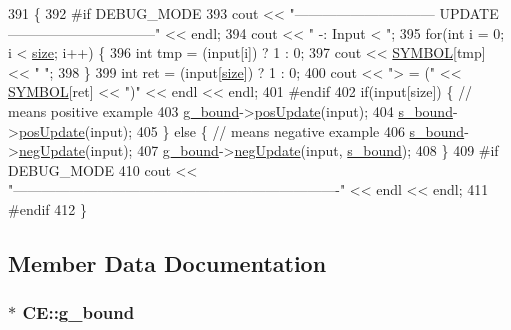\begin{DoxyCode}
391                              \{
392 \textcolor{preprocessor}{#if DEBUG\_MODE}
393 \textcolor{preprocessor}{}  cout << \textcolor{stringliteral}{"------------------------------ UPDATE --------------------------------"} << endl;
394   cout << \textcolor{stringliteral}{" -: Input < "};
395   \textcolor{keywordflow}{for}(\textcolor{keywordtype}{int} i = 0; i < \hyperlink{class_c_e_a379f23d0ec5cc0448ad7c1428403e005}{size}; i++) \{
396     \textcolor{keywordtype}{int} tmp = (input[i]) ? 1 : 0;
397     cout << \hyperlink{concept_8cpp_a6a0fcd5aed2dc21ce5f79cbe7c3a8e2f}{SYMBOL}[tmp] << \textcolor{stringliteral}{" "};
398   \}
399   \textcolor{keywordtype}{int} ret = (input[\hyperlink{class_c_e_a379f23d0ec5cc0448ad7c1428403e005}{size}]) ? 1 : 0;
400   cout << \textcolor{stringliteral}{"> = ("} << \hyperlink{concept_8cpp_a6a0fcd5aed2dc21ce5f79cbe7c3a8e2f}{SYMBOL}[ret] << \textcolor{stringliteral}{")"} << endl << endl;
401 \textcolor{preprocessor}{#endif}
402 \textcolor{preprocessor}{}  \textcolor{keywordflow}{if}(input[size]) \{    \textcolor{comment}{// means positive example}
403     \hyperlink{class_c_e_a3da8db7000668aa321d9321119a83aab}{g\_bound}->\hyperlink{class_g___bound_ad44aeb38feed0ff7e9a2f29f2ada0ac9}{posUpdate}(input);
404     \hyperlink{class_c_e_a9a2c44f7213356ff82f0ef3dbcf2e3cc}{s\_bound}->\hyperlink{class_s___bound_a819f6cff5025a4916e6c1e5c798721f5}{posUpdate}(input);
405   \} \textcolor{keywordflow}{else} \{  \textcolor{comment}{// means negative example}
406     \hyperlink{class_c_e_a9a2c44f7213356ff82f0ef3dbcf2e3cc}{s\_bound}->\hyperlink{class_s___bound_a022c42224af39423c1251ca345fe31de}{negUpdate}(input);
407     \hyperlink{class_c_e_a3da8db7000668aa321d9321119a83aab}{g\_bound}->\hyperlink{class_g___bound_a567a0759047141b59389ec0beefb0a6c}{negUpdate}(input, \hyperlink{class_c_e_a9a2c44f7213356ff82f0ef3dbcf2e3cc}{s\_bound});
408   \}
409 \textcolor{preprocessor}{#if DEBUG\_MODE}
410 \textcolor{preprocessor}{}  cout << \textcolor{stringliteral}{"----------------------------------------------------------------------"} << endl << endl;
411 \textcolor{preprocessor}{#endif}
412 \textcolor{preprocessor}{}\}
\end{DoxyCode}


\subsection{Member Data Documentation}
\hypertarget{class_c_e_a3da8db7000668aa321d9321119a83aab}{
\subsubsection[{g\-\_\-bound}]{$\ast$ C\-E\-::g\-\_\-bound\hspace{0.3cm}{\ttfamily [private]}}}\label{class_c_e_a3da8db7000668aa321d9321119a83aab}


